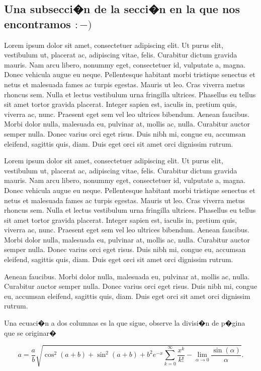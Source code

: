 \documentclass[10pt,twoside]{rcmart} %
\begin{document}
\subsection{Una subsecci�n de la secci�n en la que nos encontramos $:-)$}

Lorem ipsum dolor sit amet, consectetuer adipiscing elit. Ut purus elit, vestibulum ut, placerat ac, adipiscing vitae, felis. Curabitur dictum gravida mauris. Nam arcu libero, nonummy eget, consectetuer id, vulputate a, magna. Donec vehicula augue eu neque. Pellentesque habitant morbi tristique senectus et netus et malesuada fames ac turpis egestas. Mauris ut leo. Cras viverra metus rhoncus sem. Nulla et lectus vestibulum urna fringilla ultrices. Phasellus eu tellus sit amet tortor gravida placerat. Integer sapien est, iaculis in, pretium quis, viverra ac, nunc. Praesent eget sem vel leo ultrices bibendum. Aenean faucibus. Morbi dolor nulla, malesuada eu, pulvinar at, mollis ac, nulla. Curabitur auctor semper nulla. Donec varius orci eget risus. Duis nibh mi, congue eu, accumsan eleifend, sagittis quis, diam. Duis eget orci sit amet orci dignissim rutrum.

Lorem ipsum dolor sit amet, consectetuer adipiscing elit. Ut purus elit, vestibulum ut, placerat ac, adipiscing vitae, felis. Curabitur dictum gravida mauris. Nam arcu libero, nonummy eget, consectetuer id, vulputate a, magna. Donec vehicula augue eu neque. Pellentesque habitant morbi tristique senectus et netus et malesuada fames ac turpis egestas. Mauris ut leo. Cras viverra metus rhoncus sem. Nulla et lectus vestibulum urna fringilla ultrices. Phasellus eu tellus sit amet tortor gravida placerat. Integer sapien est, iaculis in, pretium quis, viverra ac, nunc. Praesent eget sem vel leo ultrices bibendum. Aenean faucibus. Morbi dolor nulla, malesuada eu, pulvinar at, mollis ac, nulla. Curabitur auctor semper nulla. Donec varius orci eget risus. Duis nibh mi, congue eu, accumsan eleifend, sagittis quis, diam. Duis eget orci sit amet orci dignissim rutrum.

Aenean faucibus. Morbi dolor nulla, malesuada eu, pulvinar at, mollis ac, nulla. Curabitur auctor semper nulla. Donec varius orci eget risus. Duis nibh mi, congue eu, accumsan eleifend, sagittis quis, diam. Duis eget orci sit amet orci dignissim rutrum. 

Una ecuaci�n a dos columnas es la que sigue, observe la divisi�n de p�gina que se originar� 

\begin{widetext}
\begin{equation}
a=\frac{a}{b}\sqrt{\cos ^{2}(a+b)+\sin
	^{2}(a+b)+b^{2}e^{-x}\sum_{k=0}^{\infty }\frac{x^{k}}{k!}-\lim_{\alpha
		\rightarrow 0}\frac{\sin \left( \alpha \right) }{\alpha }}.
\end{equation}
\end{widetext}
\end{document}
